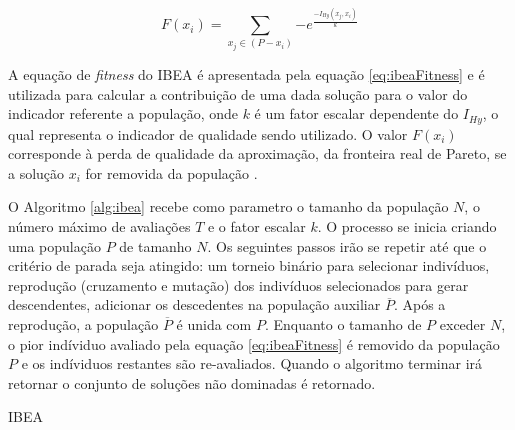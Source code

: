 \begin{equation} \label{eq:ibeaFitness}
F(x_i) = \sum_{x_j \in (P-x_i)} {-e^\frac{-I_{Hy}(x_j,x_i)}{k}}
\end{equation}

A equação de \textit{fitness} do IBEA é apresentada pela equação \ref{eq:ibeaFitness} e é utilizada para calcular a contribuição de uma dada solução
para o valor do indicador referente a população, onde $k$ é um fator escalar dependente do $I_{Hy}$, o qual representa o indicador de qualidade sendo utilizado. O valor $F(x_i)$ corresponde à perda de qualidade da aproximação, da fronteira real de Pareto, se a solução $x_i$ for removida da população \cite{figueiredo2013algoritmo}.


O Algoritmo \ref{alg:ibea} recebe como parametro o tamanho da população $N$, o número máximo de avaliações $T$ e o fator escalar $k$. O processo se inicia
criando uma população $P$ de tamanho $N$. Os seguintes passos irão se repetir até que o critério de parada seja atingido: um torneio binário 
para selecionar indivíduos, reprodução (cruzamento e mutação) dos indivíduos selecionados para gerar descendentes, adicionar os descedentes na população
auxiliar $\overline P$. Após a reprodução, a população $\overline P$ é unida com $P$. Enquanto o tamanho de $P$ exceder $N$, o pior indíviduo avaliado
pela equação \ref{eq:ibeaFitness} é removido da população $P$ e os indíviduos restantes são re-avaliados. Quando o algoritmo terminar irá retornar o conjunto
de soluções não dominadas é retornado.

\begin{algorithm}[htb!]
	\begin{algorithmic}[1]
		
		
		
		
		\EndWhile
		
		\EndWhile
		
	\end{algorithmic}
	\caption{IBEA}
	\label{alg:ibea}
\end{algorithm}


